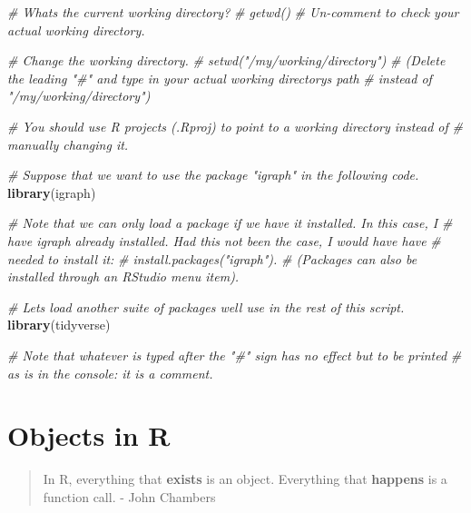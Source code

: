 \documentclass[
]{book}
\newenvironment{Shaded}{\begin{snugshade}}{\end{snugshade}}
\newcommand{\CommentTok}[1]{\textcolor[rgb]{0.56,0.35,0.01}{\textit{#1}}}
\newcommand{\FunctionTok}[1]{\textcolor[rgb]{0.13,0.29,0.53}{\textbf{#1}}}
\newcommand{\NormalTok}[1]{#1}
\begin{document}
\begin{Shaded}
\begin{Highlighting}[]
\CommentTok{\# What\textquotesingle{}s the current working directory? }
\CommentTok{\# getwd() }
\CommentTok{\# Un{-}comment to check your actual working directory.}

\CommentTok{\# Change the working directory. }
\CommentTok{\# setwd("/my/working/directory") }
\CommentTok{\# (Delete the leading "\#" and type in your actual working directory\textquotesingle{}s path}
\CommentTok{\# instead of "/my/working/directory")}

\CommentTok{\# You should use R projects (.Rproj) to point to a working directory instead of}
\CommentTok{\# manually changing it.}

\CommentTok{\# Suppose that we want to use the package "igraph" in the following code.}
\FunctionTok{library}\NormalTok{(igraph)}

\CommentTok{\# Note that we can only load a package if we have it installed. In this case, I}
\CommentTok{\# have igraph already installed. Had this not been the case, I would have have}
\CommentTok{\# needed to install it: }
\CommentTok{\# install.packages("igraph").}
\CommentTok{\# (Packages can also be installed through an RStudio menu item).}

\CommentTok{\# Let\textquotesingle{}s load another suite of packages we\textquotesingle{}ll use in the rest of this script.}
\FunctionTok{library}\NormalTok{(tidyverse)}

\CommentTok{\# Note that whatever is typed after the "\#" sign has no effect but to be printed}
\CommentTok{\# as is in the console: it is a comment.}
\end{Highlighting}
\end{Shaded}

\hypertarget{objects-in-r}{%
\section{Objects in R}\label{objects-in-r}}

\begin{quote}
In R, everything that \textbf{exists} is an object. Everything that \textbf{happens} is a function call.
- John Chambers
\end{quote}
\end{document}
